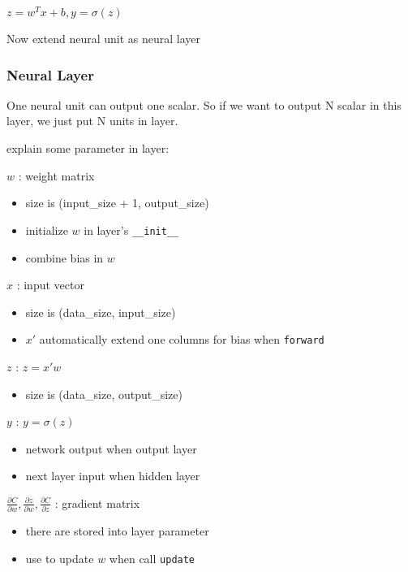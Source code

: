 \documentclass[11pt]{article}
\providecommand{\tightlist}{%
      \setlength{\itemsep}{0pt}\setlength{\parskip}{0pt}}
\begin{document}
\(z=w^Tx+b, y=\sigma(z)\)

Now extend neural unit as neural layer

    \hypertarget{neural-layer}{%
\subsubsection{Neural Layer}\label{neural-layer}}

One neural unit can output one scalar. So if we want to output N scalar
in this layer, we just put N units in layer.

explain some parameter in layer:

\(w\) : weight matrix

\begin{itemize}
\item
  size is (input\_size + 1, output\_size)
\item
  initialize \(w\) in layer's \texttt{\_\_init\_\_}
\item
  combine bias in \(w\)
\end{itemize}

\(x\) : input vector

\begin{itemize}
\item
  size is (data\_size, input\_size)
\item
  \(x'\) automatically extend one columns for bias when \texttt{forward}
\end{itemize}

\(z\) : \(z = x'w\)

\begin{itemize}
\tightlist
\item
  size is (data\_size, output\_size)
\end{itemize}

\(y\) : \(y = \sigma(z)\)

\begin{itemize}
\item
  network output when output layer
\item
  next layer input when hidden layer
\end{itemize}

\(\frac{\partial C}{\partial w}, \frac{\partial z}{\partial w}, \frac{\partial C}{\partial z}\)
: gradient matrix

\begin{itemize}
\item
  there are stored into layer parameter
\item
  use to update \(w\) when call \texttt{update}
\end{itemize}
\end{document}
